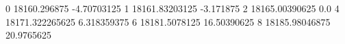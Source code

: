 0 18160.296875 -4.70703125
1 18161.83203125 -3.171875
2 18165.00390625 0.0
4 18171.322265625 6.318359375
6 18181.5078125 16.50390625
8 18185.98046875 20.9765625
